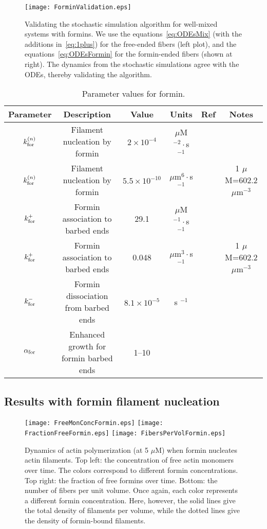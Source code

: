 \documentclass[11pt]{article}
\begin{document}
\begin{figure}
\centering
\texttt{[image: ForminValidation.eps]}
\caption{\label{fig:ForminValid}Validating the stochastic simulation algorithm for well-mixed systems with formins. We use the equations\ \eqref{eq:ODEsMix} (with the additions in\ \eqref{eq:1plus}) for the free-ended fibers (left plot), and the equations\ \eqref{eq:ODEsFormin} for the formin-ended fibers (shown at right). The dynamics from the stochastic simulations agree with the ODEs, thereby validating the algorithm. }
\end{figure}


\begin{table}
\begin{center}
\begin{tabular}{|c|c|c|c|c|c|}\hline
Parameter & Description & Value & Units & Ref & Notes \\ \hline
$k_\text{for}^{(n)}$ & Filament nucleation by formin & $2 \times 10^{-4}$ & $\mu$M$^{-2}\cdot$s$^{-1}$& \cite{paul2008role} & \\ 
$k_\text{for}^{(n)}$ & Filament nucleation by formin & $5.5 \times 10^{-10}$ & $\mu$m$^{6} \cdot$s$^{-1}$ & \cite{paul2008role} & 1 $\mu$M=602.2 $\mu$m$^{-3}$ \\ 
$k_\text{for}^+$ & Formin association to barbed ends& 29.1 & $\mu$M$^{-1} \cdot $s$^{-1}$ & \cite{shekhar2015formin}& \\
$k_\text{for}^+$ & Formin association to barbed ends&0.048 & $\mu$m$^{3} \cdot$s$^{-1}$ & \cite{shekhar2015formin}& 1 $\mu$M=602.2 $\mu$m$^{-3}$ \\
$k_\text{for}^-$ & Formin dissociation from barbed ends& $8.1 \times 10^{-5}$ & s $^{-1}$ & \cite{shekhar2015formin}& \\
$\alpha_\text{for}$ & Enhanced growth for formin barbed ends & 1--10 & & &\\ \hline
\end{tabular}
\caption{\label{tab:paramsF} Parameter values for formin.}
\end{center}
\end{table}

\subsection{Results with formin filament nucleation}
\begin{figure}
\centering
\texttt{[image: FreeMonConcFormin.eps]}
\texttt{[image: FractionFreeFormin.eps]}
\texttt{[image: FibersPerVolFormin.eps]}
\caption{\label{fig:ActinNucWithFormin}Dynamics of actin polymerization (at 5 $\mu$M) when formin nucleates actin filaments. Top left: the concentration of free actin monomers over time. The colors correspond to different formin concentrations. Top right: the fraction of free formins over time. Bottom: the number of fibers per unit volume. Once again, each color represents a different formin concentration. Here, however, the solid lines give the total density of filaments per volume, while the dotted lines give the density of formin-bound filaments.}
\end{figure}
\end{document}
